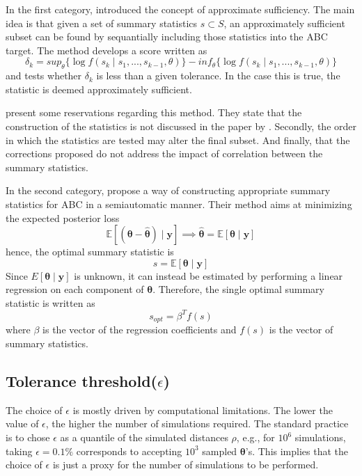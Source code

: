 \documentclass[runningheads]{llncs}
\begin{document}
In the first category, \citet{Joyce2008} introduced the concept
of approximate sufficiency. The main idea is that given a set
of summary statistics $s \subset S$, an approximately sufficient subset can
be found by sequantially including those statistics into the ABC
target. The method develops a score written as
\begin{equation}
\delta_k = sup_\theta \{
\log f(s_k \mid s_1,...,s_{k-1},\theta)
\}
- inf_\theta\{
\log f(s_k \mid s_1,...,s_{k-1},\theta)
\}
\end{equation}
and tests whether $\delta_k$ is less than a given tolerance. In the
case this is true, the statistic is deemed approximately sufficient.

\citet{Marin2012} present some reservations regarding this method.
They state that the construction of the statistics is not
discussed in the paper by \citet{Joyce2008}. Secondly, the
order in which the statistics are tested may alter the final subset.
And finally, that the corrections proposed do not address the impact
of correlation between the summary statistics.

In the second category,
\citet{fearnhead2010constructing} propose a way of constructing
appropriate summary statistics for ABC in a semiautomatic manner.
Their method aims at minimizing the expected posterior loss
\begin{equation}
\mathbb E[(\bm\theta - \bm{\hat\theta})\mid \bm y]
\implies
\bm {\hat\theta} = \mathbb E[\bm\theta \mid \bm y]
\end{equation}
hence, the optimal summary statistic is
\begin{equation}
s = \mathbb E[\bm \theta \mid \bm y]
\end{equation}
Since $E[\bm \theta \mid \bm y]$ is unknown, it can instead
be estimated by performing a linear regression on each
component of $\bm \theta$. Therefore, the single optimal
summary statistic is written as
\begin{equation}
s_{opt} =  \beta^T f(s)
\end{equation}
where $\beta$ is the vector of the regression coefficients and
$f(s)$ is the vector of summary statistics.


\subsection{Tolerance threshold($\epsilon$)}
\label{subsec:statistical-summaries}
The choice of $\epsilon$ is mostly driven by computational
limitations. The lower the value of $\epsilon$, the higher
the number of simulations required. The standard practice
\citep{Beaumont2012} is to chose $\epsilon$ as a quantile
of the simulated distances $\rho$, e.g., for $10^6$ simulations,
taking $\epsilon = 0.1\%$ corresponds to accepting
$10^3$ sampled $\bm \theta$'s. This implies that the choice
of $\epsilon$ is just a proxy for the number of simulations
to be performed.


%
%
%


%
\end{document}
